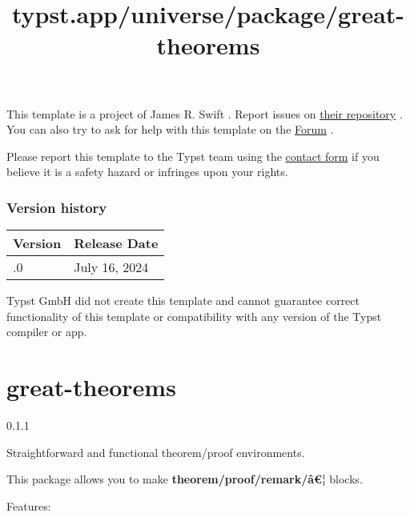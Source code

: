 This template is a project of James R. Swift . Report issues on
\href{https://github.com/JamesxX/splendid-mdpi}{their repository} . You
can also try to ask for help with this template on the
\href{https://forum.typst.app}{Forum} .

Please report this template to the Typst team using the
\href{https://typst.app/contact}{contact form} if you believe it is a
safety hazard or infringes upon your rights.

\label{versions}
\subsubsection{Version history}\label{version-history}

\begin{longtable}[]{@{}ll@{}}
\toprule\noalign{}
Version & Release Date \\
\midrule\noalign{}
\endhead
\bottomrule\noalign{}
\endlastfoot
0.1.0 & July 16, 2024 \\
\end{longtable}

Typst GmbH did not create this template and cannot guarantee correct
functionality of this template or compatibility with any version of the
Typst compiler or app.


\title{typst.app/universe/package/great-theorems}

\label{banner}
\section{great-theorems}\label{great-theorems}

{ 0.1.1 }

Straightforward and functional theorem/proof environments.

\label{readme}
This package allows you to make \textbf{theorem/proof/remark/â€¦}
blocks.

Features:

